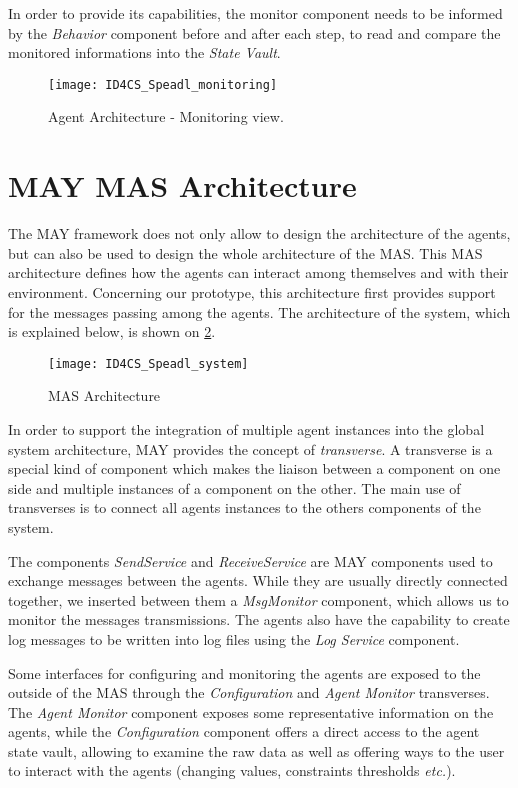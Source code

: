 In order to provide its capabilities, the monitor component needs to be informed by the \emph{Behavior} component before and after each step, to read and compare the monitored informations into the \emph{State Vault}.

\begin{figure}
\centering
\texttt{[image: ID4CS\_Speadl\_monitoring]}
\caption{Agent Architecture - Monitoring view.}
\label{Arch-monitor}
\end{figure}

\section{MAY MAS Architecture}

The MAY framework does not only allow to design the architecture of the agents, but can also be used to design the whole architecture of the MAS. This MAS architecture defines how the agents can interact among themselves and with their environment. Concerning our prototype, this architecture first provides support for the messages passing among the agents. The architecture of the system, which is explained below, is shown on \figurename{} \ref{Arch-MAS}.

\begin{figure}
\texttt{[image: ID4CS\_Speadl\_system]}
\caption{MAS Architecture}\label{Arch-MAS}
\end{figure}

In order to support the integration of multiple agent instances into the global system architecture, MAY provides the concept of \emph{transverse}. A transverse is a special kind of component which makes the liaison between a component on one side and multiple instances of a component on the other. The main use of transverses is to connect all agents instances to the others components of the system.

The components \emph{SendService} and \emph{ReceiveService} are MAY components used to exchange messages between the agents. While they are usually directly connected together, we inserted between them a \emph{MsgMonitor} component, which allows us to monitor the messages transmissions. The agents also have the capability to create log messages to be written into log files using the \emph{Log Service} component.

Some interfaces for configuring and monitoring the agents are exposed to the outside of the MAS through the \emph{Configuration} and \emph{Agent Monitor} transverses. The \emph{Agent Monitor} component exposes some representative information on the agents, while the \emph{Configuration} component offers a direct access to the agent state vault, allowing to examine the raw data as well as offering ways to the user to interact with the agents (changing values, constraints thresholds \emph{etc.}).

